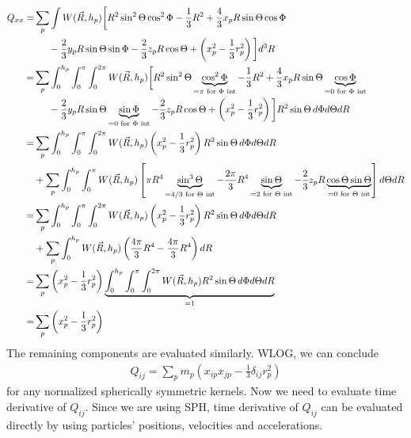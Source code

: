 \documentclass{article}
\begin{document}
\begin{align}
Q_{xx} =& \sum_p \int W(\vec{R}, h_p) \bigg[ R^2 \sin^2 \Theta \cos^2 \Phi - \frac{1}{3} R^2 
                +\frac{4}{3} x_p R \sin \Theta \cos \Phi \nonumber \\
               &\indent - \frac{2}{3} y_p R \sin \Theta \sin \Phi 
                -\frac{2}{3} z_p R \cos \Theta + \left( x_p^2 - \frac{1}{3} r_p^2\right) \bigg] d^3 R \nonumber \\
             = & \sum_p \int_0^{h_p} \int_0^\pi \int_0^{2\pi} W(\vec{R}, h_p) \bigg[ R^2 \sin^2 \Theta \underbrace{ \cos^2 \Phi}_{=\pi \,\, \textrm{for}\,\,  \Phi \,\, \textrm{int}} - \frac{1}{3} R^2 
                +\frac{4}{3} x_p R \sin \Theta  \underbrace{\cos \Phi}_{=0 \,\, \textrm{for}\,\,  \Phi \,\, \textrm{int}}\nonumber \\
               &\indent - \frac{2}{3} y_p R \sin \Theta \underbrace{\sin \Phi}_{=0 \,\, \textrm{for}\,\,  \Phi \,\, \textrm{int}} 
                -\frac{2}{3} z_p R \cos \Theta + \left( x_p^2 - \frac{1}{3} r_p^2\right) \bigg] R^2 \sin \Theta\, d \Phi d\Theta dR \nonumber \\
                =& \sum_p \int_0^{h_p} \int_0^\pi \int_0^{2\pi} W(\vec{R}, h_p) 
                \left( x_p^2 - \frac{1}{3} r_p^2\right) R^2 \sin \Theta\, d \Phi d\Theta dR \nonumber \\
              &+   \sum_p \int_0^{h_p} \int_0^\pi W(\vec{R}, h_p) \left[ \pi R^4 \underbrace{\sin^3\Theta}_{=4/3 \,\, \textrm{for}\,\,  \Theta \,\, \textrm{int}} 
               - \frac{2\pi}{3} R^4 \underbrace{\sin\Theta}_{=2 \,\, \textrm{for}\,\,  \Theta \,\, \textrm{int}} 
              - \frac{2}{3} z_p R \underbrace{\cos \Theta \sin \Theta}_{=0 \,\, \textrm{for}\,\,  \Theta\,\, \textrm{int}} \right] d\Theta dR \nonumber \\
                =& \sum_p \int_0^{h_p} \int_0^\pi \int_0^{2\pi} W(\vec{R}, h_p) 
                \left( x_p^2 - \frac{1}{3} r_p^2\right) R^2 \sin \Theta\, d \Phi d\Theta dR \nonumber \\ 
                &+  \sum_p \int_0^{h_p}  W(\vec{R}, h_p) \left(\frac{4 \pi}{3} R^4 - \frac{4 \pi}{3} R^4\right) dR\nonumber \\
                =& \sum_p  \left( x_p^2 - \frac{1}{3} r_p^2\right)\underbrace{ \int_0^{h_p} \int_0^\pi \int_0^{2\pi} W(\vec{R}, h_p) 
                R^2 \sin \Theta\, d \Phi d\Theta dR}_{=1} \nonumber \\ 
                =& \sum_p  \left( x_p^2 - \frac{1}{3} r_p^2\right)
\end{align}
The remaining components are evaluated similarly. WLOG, we can conclude
\begin{align}
Q_{ij} = \sum_p m_p \left(x_{ip} x_{jp} - \frac{1}{3} \delta_{ij} r_p^2 \right)
\end{align}
for any normalized spherically symmetric kernels. Now we need to evaluate time derivative of $Q_{ij}$.
Since we are using SPH, time derivative of $Q_{ij}$ can be evaluated directly by using particles' positions,
velocities and accelerations. 
\end{document}
